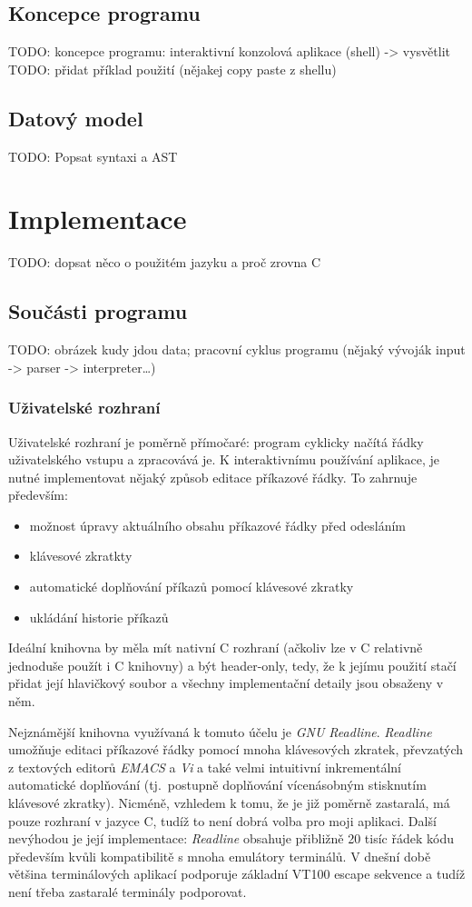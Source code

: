 \documentclass[thesis=B,czech]{FITthesis}[2019/03/06]
\newcommand{\Rplus}{\protect\hspace{-.1em}\protect\raisebox{.35ex}{\smaller{\smaller\textbf{+}}}}
\newcommand{\Cpp}{\mbox{C\Rplus\Rplus}\xspace}
\begin{document}
\section{Koncepce programu}
TODO: koncepce programu: interaktivní konzolová aplikace (shell) -> vysvětlit
TODO: přidat příklad použití (nějakej copy paste z shellu)

\section{Datový model}
TODO: Popsat syntaxi a AST


\chapter{Implementace}
TODO: dopsat něco o použitém jazyku a proč zrovna \Cpp{}

\section{Součásti programu}
TODO: obrázek kudy jdou data; pracovní cyklus programu (nějaký vývoják input -> parser -> interpreter\ldots)

\subsection{Uživatelské rozhraní}
Uživatelské rozhraní je poměrně přímočaré: program cyklicky načítá řádky uživatelského vstupu a zpracovává je. K interaktivnímu používání aplikace, je nutné implementovat nějaký způsob editace příkazové řádky. To zahrnuje především:
\begin{itemize}
\item možnost úpravy aktuálního obsahu příkazové řádky před odesláním
\item klávesové zkratkty 
\item automatické doplňování příkazů pomocí klávesové zkratky
\item ukládání historie příkazů
\end{itemize}
Ideální knihovna by měla mít nativní \Cpp{} rozhraní (ačkoliv lze v \Cpp{} relativně jednoduše použít i C knihovny) a být header-only, tedy, že k jejímu použití stačí přidat její hlavičkový soubor a všechny implementační detaily jsou obsaženy v něm.

Nejznámější knihovna využívaná k tomuto účelu je \textit{GNU Readline}. \textit{Readline} umožňuje editaci příkazové řádky pomocí mnoha klávesových zkratek, převzatých z textových editorů \textit{EMACS} a \textit{Vi} a také velmi intuitivní inkrementální automatické doplňování (tj.\ postupně doplňování vícenásobným stisknutím klávesové zkratky). Nicméně, vzhledem k tomu, že je již poměrně zastaralá, má pouze rozhraní v jazyce C, tudíž to není dobrá volba pro moji aplikaci. Další nevýhodou je její implementace: \textit{Readline} obsahuje přibližně 20 tisíc řádek kódu především kvůli kompatibilitě s mnoha emulátory terminálů. V dnešní době většina terminálových aplikací podporuje základní VT100 escape sekvence a tudíž není třeba zastaralé terminály podporovat.
\end{document}
